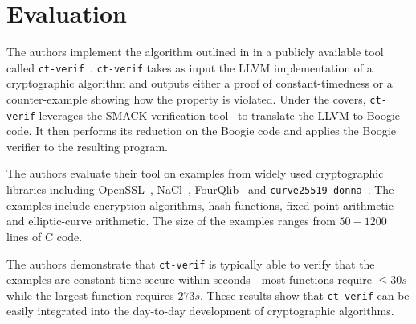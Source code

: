 \section{Evaluation}
\label{results}

The authors implement the algorithm outlined in  in a publicly available tool called \texttt{ct-verif}~\cite{ct-verif-github}. 
\texttt{ct-verif} takes as input the LLVM implementation of a cryptographic algorithm and outputs either a proof of constant-timedness or a counter-example showing how the property is violated. 
Under the covers, \texttt{ct-verif} leverages the SMACK verification tool~\cite{smack} to translate the LLVM to Boogie~\cite{boogie} code. 
It then performs its reduction on the Boogie code and applies the Boogie verifier to the resulting program. 

The authors evaluate their tool on examples from widely used cryptographic libraries including OpenSSL~\cite{openssl}, NaCl~\cite{nacl}, FourQlib~\cite{fourqlib} and \texttt{curve25519-donna}~\cite{donna}. The examples include encryption algorithms, hash functions, fixed-point arithmetic and elliptic-curve arithmetic. 
The size of the examples ranges from $50-1200$ lines of C code.

The authors demonstrate that \texttt{ct-verif} is typically able to verify that the examples are constant-time secure within seconds---most functions require $\leq 30s$ while the largest function requires $273s$. 
These results show that \texttt{ct-verif} can be easily integrated into the day-to-day development of cryptographic algorithms. 